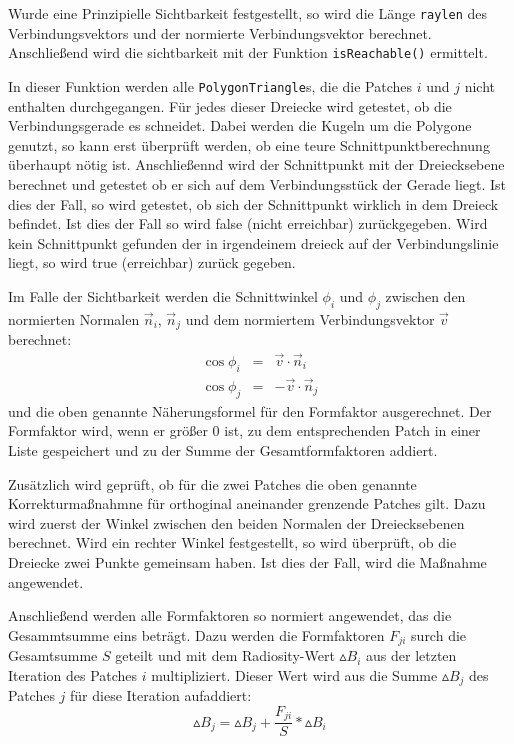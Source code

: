 \documentclass[final,a4paper,11pt,notitlepage,halfparskip]{scrreprt}
\begin{document}
Wurde eine Prinzipielle Sichtbarkeit festgestellt, so wird die Länge
\texttt{raylen} des Verbindungsvektors und der normierte Verbindungsvektor
berechnet. Anschließend wird die sichtbarkeit mit der Funktion
\texttt{isReachable()} ermittelt.

In dieser Funktion werden alle \texttt{PolygonTriangle}s, die die Patches $i$
und $j$ nicht enthalten durchgegangen. Für jedes dieser Dreiecke wird getestet,
ob die Verbindungsgerade es schneidet. Dabei werden die Kugeln um die Polygone
genutzt, so kann erst überprüft werden, ob eine teure Schnittpunktberechnung
überhaupt nötig ist. Anschließennd wird der Schnittpunkt mit der Dreiecksebene 
berechnet und getestet ob er sich auf dem Verbindungsstück der Gerade liegt. Ist
dies der Fall, so wird getestet, ob sich der Schnittpunkt wirklich in dem
Dreieck befindet. Ist dies der Fall so wird false (nicht erreichbar)
zurückgegeben. Wird kein Schnittpunkt gefunden der in irgendeinem dreieck auf
der Verbindungslinie liegt, so wird true (erreichbar) zurück gegeben.

Im Falle der Sichtbarkeit werden die Schnittwinkel $\phi_i$ und $\phi_j$ 
zwischen den normierten Normalen $\vec{n}_i$, $\vec{n}_j$ und dem normiertem
Verbindungsvektor $\vec{v}$ berechnet:
\begin{eqnarray*}
  \cos\phi_i &=& \vec{v} \cdot \vec{n}_i\\
  \cos\phi_j &=& -\vec{v} \cdot \vec{n}_j
\end{eqnarray*}
und die oben genannte Näherungsformel für den Formfaktor ausgerechnet.
Der Formfaktor wird, wenn er größer $0$ ist, zu dem entsprechenden Patch in 
einer Liste gespeichert und zu der Summe der Gesamtformfaktoren addiert.

Zusätzlich wird geprüft, ob für die zwei Patches die oben genannte 
Korrekturmaßnahmne für orthoginal aneinander grenzende Patches gilt. Dazu wird 
zuerst der Winkel zwischen den beiden Normalen der Dreiecksebenen berechnet. 
Wird ein rechter Winkel festgestellt, so wird überprüft, ob die Dreiecke zwei 
Punkte gemeinsam haben. Ist dies der Fall, wird die Maßnahme angewendet.

Anschließend werden alle Formfaktoren so normiert angewendet, das die
Gesammtsumme eins beträgt. Dazu werden die Formfaktoren $F_{ji}$ surch die
Gesamtsumme $S$ geteilt und mit dem Radiosity-Wert $\vartriangle B_i$ aus der
letzten Iteration des Patches $i$ multipliziert. Dieser Wert wird aus die 
Summe $\vartriangle B_j$ des Patches $j$ für diese Iteration aufaddiert:
$$\vartriangle{B_j} = \vartriangle{B_j} + \frac{F_{ji}}{S} * \vartriangle B_i$$
\end{document}
